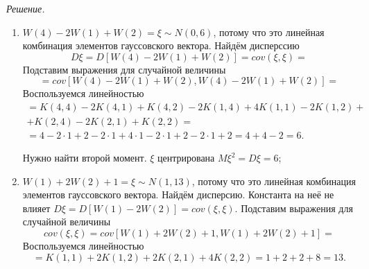 \textit{Решение.}
\begin{enumerate}[label=\alph*)]
  \item $W \left( 4 \right) - 2W \left( 1 \right) + W \left( 2 \right) =
    \xi \sim
    N \left( 0, 6 \right) $,
  потому что это линейная комбинация элементов гауссовского вектора.
  Найдём дисперссию
  $$D \xi =
    D \left[ W \left( 4 \right) - 2W \left( 1 \right) + W \left( 2 \right) \right] =
    cov \left( \xi, \xi \right) =$$
  Подставим выражения для случайной величины
  $$= cov \left[
      W \left( 4 \right) - 2W \left( 1 \right) + W \left( 2 \right),
      W \left( 4 \right) - 2W \left( 1 \right) + W \left( 2 \right) \right] =$$
  Воспользуемся линейностью
  \begin{gather*}
    = K \left( 4, 4 \right) - 2K \left( 4, 1 \right) + K \left( 4, 2 \right) -
    2K \left( 1, 4 \right) + 4K \left( 1, 1 \right) - 2K \left( 1, 2 \right) + \\
    + K \left( 2, 4 \right) - 2K \left( 2, 1 \right) + K \left( 2, 2 \right) = \\
    = 4 - 2 \cdot 1 + 2 - 2 \cdot 1 + 4 \cdot 1 - 2 \cdot 1 + 2 - 2 \cdot 1 + 2 =
    4 + 4 - 2 =
    6.
  \end{gather*}

  Нужно найти второй момент.
  $ \xi $ центрирована $M \xi^2 = D \xi = 6$;
  \item $W \left( 1 \right) + 2W \left( 2 \right) + 1 =
    \xi \sim
    N \left( 1, 13 \right) $,
  потому что это линейная комбинация элементов гауссовского вектора.
  Найдём дисперсию.
  Константа на неё не влияет
  $D \xi =
    D \left[ W \left( 1 \right) - 2W \left( 2 \right) \right] =
    cov \left( \xi, \xi \right) $.
  Подставим выражения для случайной величины
  $$cov \left( \xi, \xi \right) =
    cov \left[
      W \left( 1 \right) + 2W \left( 2 \right) + 1,
      W \left( 1 \right) + 2W \left( 2 \right) + 1 \right] =$$
  Воспользуемся линейностью
  $$= K \left( 1, 1 \right) + 2K \left( 1, 2 \right) + 2K \left( 2, 1 \right) +
    4K \left( 2, 2 \right) =
    1 + 2 + 2 + 8 =
    13.$$


\end{enumerate}
